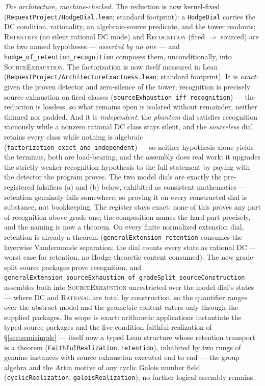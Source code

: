\documentclass[11pt]{article}
\theoremstyle{definition}
\theoremstyle{remark}
\begin{document}
\noindent\emph{The architecture, machine-checked.} The reduction is now
kernel-fixed (\texttt{RequestProject/HodgeDial.lean}; standard footprint): a
\texttt{HodgeDial} carries the DC condition, rationality, an algebraic-source
predicate, and the tower readouts; \textsc{Retention} (no silent rational DC
mode) and \textsc{Recognition} (fired $\Rightarrow$ sourced) are the two named
hypotheses --- \emph{asserted by no one} --- and
\texttt{hodge\_of\_retention\_recognition} composes them, unconditionally, into
\textsc{SourceExhaustion}. The factorization is now itself measured in Lean
(\texttt{RequestProject/ArchitectureExactness.lean}; standard footprint). It
is \emph{exact}: given the proven detector and zero-silence of the tower,
recognition is precisely source exhaustion on fired classes
(\texttt{sourceExhaustion\_iff\_recognition}) --- the reduction is lossless,
so what remains open is isolated without remainder, neither thinned nor
padded. And it is \emph{independent}: the \emph{phantom} dial satisfies
recognition vacuously while a nonzero rational DC class stays silent, and the
\emph{sourceless} dial retains every class while nothing is algebraic
(\texttt{factorization\_exact\_and\_independent}) --- so neither hypothesis
alone yields the terminus, both are load-bearing, and the assembly does real
work: it upgrades the strictly weaker recognition hypothesis to the full
statement by paying with the detector the program proves. The two model dials
are exactly the pre-registered falsifiers (a) and (b) below, exhibited as
consistent mathematics --- retention genuinely fails somewhere, so proving it
on every constructed dial is substance, not bookkeeping. The register stays
exact: none of this proves any part of recognition above grade one; the
composition names the hard part precisely, and the naming is now a theorem.
On every finite normalized extension dial, retention
is already a theorem (\texttt{generalExtension\_retention} consumes the
layerwise Vandermonde separation; the dial counts every state as rational DC
--- worst case for retention, no Hodge-theoretic content consumed). The new
grade-split source packages prove
recognition, and
\texttt{generalExtension\_sourceExhaustion\_of\_gradeSplit\_sourceConstruction}
assembles both into \textsc{SourceExhaustion} unrestricted over the model
dial's states --- where \textsc{DC} and \textsc{Rational} are total by
construction, so the quantifier ranges over the abstract model and the
geometric content enters only through the supplied packages. Its scope is
exact: arithmetic applications instantiate
the typed source packages and the five-condition faithful realization of
\S\ref{sec:semisimple} --- itself now a typed Lean structure whose retention
transport is a theorem (\texttt{FaithfulRealization.retention}), inhabited by
two rungs of genuine instances with source exhaustion executed end to end ---
the group algebra and the Artin motive of any cyclic Galois number field
(\texttt{cyclicRealization}, \texttt{galoisRealization}); no further
logical assembly remains.
\end{document}
